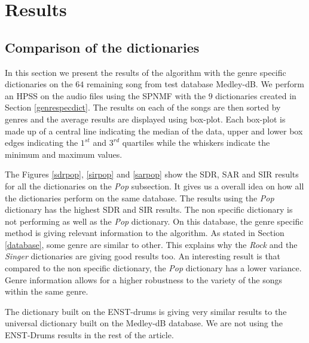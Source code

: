 \documentclass{article}
\begin{document}
\section{Results}


\subsection{Comparison of the dictionaries}

In this section we present the results of the algorithm with the genre specific dictionaries on the $64$ remaining song from test database Medley-dB. We perform an HPSS on the audio files using the SPNMF with the $9$ dictionaries created in Section \ref{genrespecdict}. The results on each of the songs are then sorted by genres and the average results are displayed using box-plot. Each box-plot is made up of a central line indicating the median of the data, upper and lower box edges indicating the $1^{st}$ and $3^{rd}$ quartiles while the whiskers indicate the minimum and maximum values. 


The Figures \ref{sdrpop}, \ref{sirpop} and \ref{sarpop} show the SDR, SAR and SIR results for all the dictionaries on the \emph{Pop} subsection. It gives us a overall idea on how all the dictionaries perform on the same database. The results using the \emph{Pop} dictionary has the highest SDR and SIR results. The non specific dictionary is not performing as well as the \emph{Pop} dictionary. On this database, the genre specific method is giving relevant information to the algorithm. As stated in Section \ref{database}, some genre are similar to other. This explains why the \emph{Rock} and the \emph{Singer} dictionaries are giving good results too. 
An interesting result is that compared to the non specific dictionary, the \emph{Pop} dictionary has a lower variance. Genre information allows for a higher robustness to the variety of the songs within the same genre.  

The dictionary built on the ENST-drums is giving very similar results to the universal dictionary built on the Medley-dB database. We are not using the ENST-Drums results in the rest of the article. 
\end{document}
